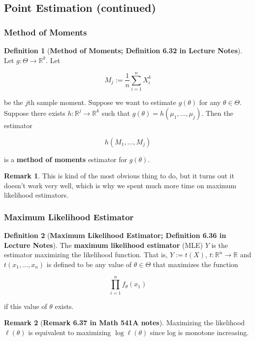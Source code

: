 \documentclass{article}
\theoremstyle{definition}
\theoremstyle{definition}
\theoremstyle{definition}
\theoremstyle{definition}
\theoremstyle{definition}
\newtheorem{definition}{Definition}[section]
\newtheorem*{remark}{Remark}
\theoremstyle{definition}
\theoremstyle{definition}
\begin{document}
\subsection{Point Estimation (continued)}

\subsubsection{Method of Moments}

\begin{definition}[\textbf{Method of Moments; Definition 6.32 in Lecture Notes}]Let \(g: \Theta \to \mathbb{R}^k\). Let 

\[
M_j := \frac{1}{n} \sum_{i=1}^n X_i^k
\]

be the \(j\)th sample moment. Suppose we want to estimate \(g(\theta)\) for any \(\theta \in \Theta\). Suppose there exists \(h: \mathbb{R}^j \to \mathbb{R}^k\) such that \(g(\theta) = h(\mu_1, \ldots, \mu_j)\). Then the estimator 

\[
h(M_1, \ldots, M_j)
\]

is a \textbf{method of moments} estimator for \(g(\theta)\).

\end{definition}

\begin{remark}This is kind of the most obvious thing to do, but it turns out it doesn't work very well, which is why we spent much more time on maximum likelihood estimators.

\end{remark}

\subsubsection{Maximum Likelihood Estimator}

\begin{definition}[\textbf{Maximum Likelihood Estimator; Definition 6.36 in Lecture Notes}]The \textbf{maximum likelihood estimator} (MLE) \(Y\) is the estimator maximizing the likelihood function. That is, \(Y:= t(X)\), \(t: \mathbb{R}^n \to \mathbb{R}\) and \(t(x_1, \ldots, x_n)\) is defined to be any value of \(\theta \in \Theta\) that maximizes the function

\[
\prod_{i=1}^n f_\theta(x_1)
\]

if this value of \(\theta\) exists. 

\end{definition}

\begin{remark}[\textbf{Remark 6.37 in Math 541A notes}]Maximizing the likelihood \(\ell(\theta)\) is equivalent to maximizing \(\log \ell(\theta)\) since log is monotone increasing.

\end{remark}
\end{document}
